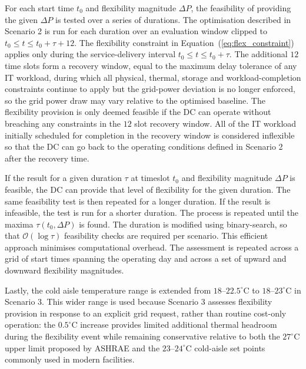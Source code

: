 \documentclass[lettersize,journal]{IEEEtran}
\newcommand{\rev}[1]{\textcolor{blue!70!black}{#1}}
\begin{document}
For each start time $t_0$ and flexibility magnitude $\Delta P$, the feasibility of providing the given $\Delta P$ is tested over a series of durations. \rev{The optimisation described in Scenario 2 is run for each duration over an evaluation window clipped to $t_0 \leq t \leq t_0 + \tau + 12$. The flexibility constraint in Equation~(\ref{eq:flex_constraint}) applies only during the service-delivery interval $t_0 \leq t \leq t_0 + \tau$. The additional $12$ time slots form a recovery window, equal to the maximum delay tolerance of any IT workload, during which all physical, thermal, storage and workload-completion constraints continue to apply but the grid-power deviation is no longer enforced, so the grid power draw may vary relative to the optimised baseline.} The flexibility provision is only deemed feasible if the DC can operate without breaching any constraints in the $12$ slot recovery window. All of the IT workload initially scheduled for completion in the recovery window is considered inflexible so that the DC can go back to the operating conditions defined in Scenario 2 after the recovery time.

If the result for a given duration $\tau$ at timeslot $t_0$ and flexibility magnitude $\Delta P$ is feasible, the DC can provide that level of flexibility for the given duration. The same feasibility test is then repeated for a longer duration. If the result is infeasible, the test is run for a shorter duration. The process is repeated until the maxima $\tau(t_0, \Delta P)$ is found. The duration is modified using binary-search, so that $\mathcal{O}(\log \tau)$ feasibility checks are required per scenario. This efficient approach minimises computational overhead. The assessment is repeated across a grid of start times spanning the operating day and across a set of upward and downward flexibility magnitudes.

Lastly, the cold aisle temperature range is extended from $18$--$22.5 ^\circ\mathrm{C}$ to $18$--$23^\circ\mathrm{C}$ in Scenario 3. \rev{This wider range is used because Scenario 3 assesses flexibility provision in response to an explicit grid request, rather than routine cost-only operation: the $0.5^\circ\mathrm{C}$ increase provides limited additional thermal headroom during the flexibility event while remaining conservative relative to both the $27^\circ\mathrm{C}$ upper limit proposed by ASHRAE \cite{tc2016data} and the $23$--$24^\circ\mathrm{C}$ cold-aisle set points commonly used in modern facilities.}
\end{document}
